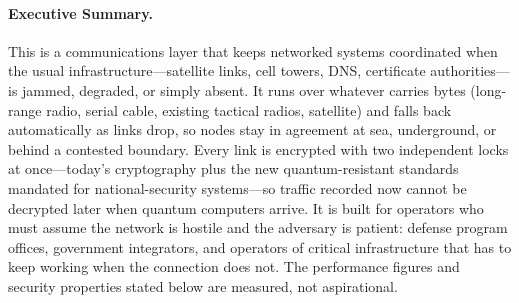 \documentclass[11pt,letterpaper]{article}
\begin{document}
\makecover

\begin{abstract}
We present a post-quantum resilient networking architecture designed for maritime, tactical edge, and disconnected/degraded/intermittent/limited-bandwidth (DDIL) environments. The system integrates the Reticulum Network Stack (RNS) as a native consensus transport layer alongside traditional IP networking, enabling validators and edge nodes to communicate over LoRa, packet radio, serial links, and mesh topologies without reliance on centralized infrastructure or DNS. All transport sessions employ hybrid post-quantum key exchange (X25519 + ML-KEM-768, ) and hybrid authentication (Ed25519 + ML-DSA-65, ), providing defense-in-depth against both classical and quantum adversaries. The architecture includes a zero-trust overlay network with identity-first micro-segmentation, a zero-copy binary protocol achieving 11.5 million transactions per second, and fault-tolerant streaming over NATS JetStream. We demonstrate sub-second consensus finality over mesh networks and analyze the system's suitability for shipboard, shore-to-ship, expeditionary, and submarine communication scenarios.
\end{abstract}

\paragraph{Executive Summary.}
This is a communications layer that keeps networked systems coordinated when the usual infrastructure---satellite links, cell towers, DNS, certificate authorities---is jammed, degraded, or simply absent. It runs over whatever carries bytes (long-range radio, serial cable, existing tactical radios, satellite) and falls back automatically as links drop, so nodes stay in agreement at sea, underground, or behind a contested boundary. Every link is encrypted with two independent locks at once---today's cryptography plus the new quantum-resistant standards mandated for national-security systems---so traffic recorded now cannot be decrypted later when quantum computers arrive. It is built for operators who must assume the network is hostile and the adversary is patient: defense program offices, government integrators, and operators of critical infrastructure that has to keep working when the connection does not. The performance figures and security properties stated below are measured, not aspirational.

\tableofcontents
\newpage
\end{document}
